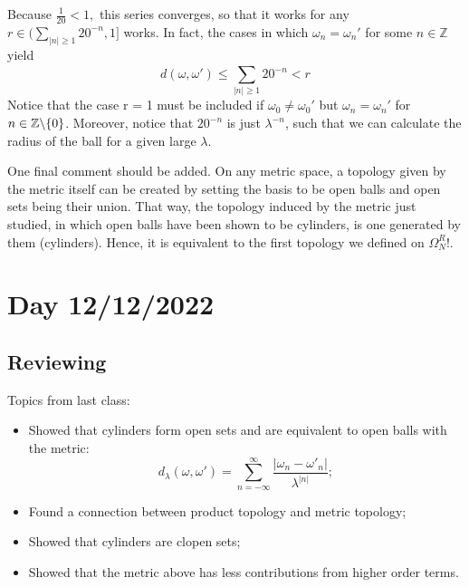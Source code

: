 \documentclass{article}
\newcommand\SLash{\char`\\}
\begin{document}
  Because $\displaystyle \frac{1}{20} < 1,$ this series converges, so that it works for any $r\in\biggl(\sum\limits_{|n|\geq{1}}^{}20^{-n}, 1\biggr]$ works.
In fact, the cases in which $\omega_{n} = \omega_{n}'$ for some $n\in \mathbb{Z}$ yield
  $$
    d(\omega, \omega')\leq \sum\limits_{|n|\geq{1}}^{}20^{-n} < r
  $$
Notice that the case r = 1 must be included if $\omega_{0}\neq \omega_{0}'$ but $\omega_{n} = \omega_{n}'$ for $n\in \mathbb{Z}\SLash \{ 0\} $. 
Moreover, notice that $20^{-n}$ is just $\lambda^{-n}$, such that we can calculate the radius of the ball for a given large $\lambda.$

  One final comment should be added. On any metric space, a topology given by the metric itself can be created by setting
the basis to be open balls and open sets being their union. That way, the topology induced by the metric just studied, in which
open balls have been shown to be cylinders, is one generated by them (cylinders). Hence, it is equivalent to the first topology we
defined on $\Omega_{N}^{R}!.$
\newpage

\section{Day 12/12/2022}
\subsection{Reviewing}
Topics from last class:
  \begin{itemize}
    \item Showed that cylinders form open sets and are equivalent to open balls with the metric:
  $$
  d_{\lambda}(\omega, \omega') = \sum_{n=-\infty}^{\infty}\frac{|\omega _{n} - \omega' _{n}|}{\lambda ^{|n|}};
  $$
  \item Found a connection between product topology and metric topology;
  \item Showed that cylinders are clopen sets;
  \item Showed that the metric above has less contributions from higher order terms.
  \end{itemize}
\end{document}
